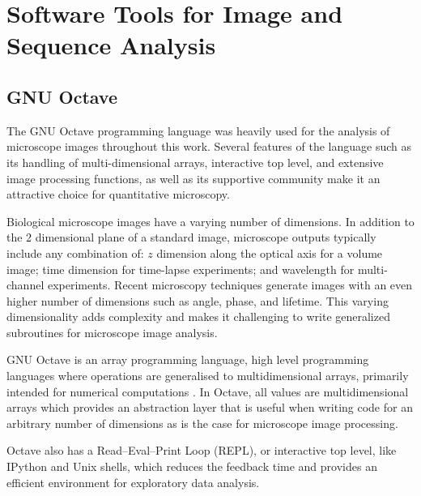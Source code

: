 \chapter{Software Tools for Image and Sequence Analysis}


\section{GNU Octave}

The GNU Octave programming language was heavily used for the analysis
of microscope images throughout this work.  Several features of the
language such as its handling of multi-dimensional arrays, interactive
top level, and extensive image processing functions, as well as
its supportive community make it an attractive choice
for quantitative microscopy.

Biological microscope images have a varying number of dimensions.
In addition to the 2 dimensional plane of a standard image, microscope
outputs typically include any combination of: $z$ dimension along
the optical axis for a volume image; time dimension for time-lapse
experiments; and wavelength for multi-channel experiments.  Recent microscopy
techniques generate images with an even higher number of dimensions
such as angle, phase, and lifetime.  This varying dimensionality adds
complexity and makes it challenging to write generalized subroutines for
microscope image analysis.

GNU Octave is an array programming language, high level programming
languages where operations are generalised to multidimensional arrays,
primarily intended for numerical computations \citep{octave}.
In Octave, all values are multidimensional arrays which provides
an abstraction layer that is useful when writing code for an arbitrary
number of dimensions as is the case for microscope image processing.

Octave also has a Read--Eval--Print Loop (REPL), or interactive top
level, like IPython and Unix shells, which reduces the
feedback time and provides an efficient
environment for exploratory data analysis.

